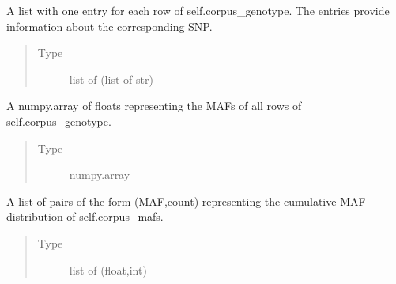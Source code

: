 \documentclass[a4paper,10pt,english]{sphinxhowto}
\begin{document}
\begin{fulllineitems}
\begin{fulllineitems}
\begin{quote}
\begin{description}
\end{description}\end{quote}

\end{fulllineitems}


\begin{fulllineitems}
\label{\detokenize{utils:utils.data_simulator.DataSimulator.corpus_snps}}
A list with one entry for each row of self.corpus\_genotype. The entries provide information
about the corresponding SNP.
\begin{quote}\begin{description}
\item[{Type}] \leavevmode
list of (list of str)

\end{description}\end{quote}

\end{fulllineitems}


\begin{fulllineitems}
\label{\detokenize{utils:utils.data_simulator.DataSimulator.corpus_mafs}}
A numpy.array of floats representing the MAFs of all rows of self.corpus\_genotype.
\begin{quote}\begin{description}
\item[{Type}] \leavevmode
numpy.array

\end{description}\end{quote}

\end{fulllineitems}


\begin{fulllineitems}
\label{\detokenize{utils:utils.data_simulator.DataSimulator.corpus_cum_mafs}}
A list of pairs of the form (MAF,count) representing the cumulative MAF distribution of self.corpus\_mafs.
\begin{quote}\begin{description}
\item[{Type}] \leavevmode
list of (float,int)


\end{description}
\end{quote}
\end{fulllineitems}
\end{fulllineitems}
\end{document}
